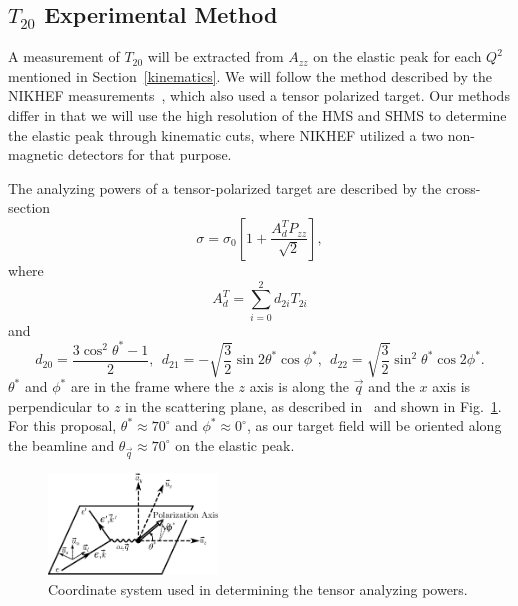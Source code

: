 \subsection{$T_{20}$ Experimental Method} %
\label{t20_exp}

A measurement of $T_{20}$ will be extracted from $A_{zz}$ on the elastic peak for each $Q^2$ mentioned in Section~\ref{kinematics}. We will follow the method described by the NIKHEF measurements~\cite{Bouwhuis:1998re}, which also used a tensor polarized target. Our methods differ in that we will use the high resolution of the HMS and SHMS to determine the elastic peak through kinematic cuts, where NIKHEF utilized a two non-magnetic detectors for that purpose. 

The analyzing powers of a tensor-polarized target are described by the cross-section
\begin{equation}
\sigma = \sigma_0\left[ 1 + \frac{A_d^T P_{zz}}{\sqrt{2}} \right],
\label{cs-ana}
\end{equation}
where
\begin{equation} A^T_d = \sum_{i=0}^{2}d_{2i}T_{2i}
\end{equation}
and
\begin{equation} d_{20} = \frac{3 \cos^2 \theta^* -1}{2},~~d_{21} = -\sqrt{\frac{3}{2}}\sin2\theta^*\cos\phi^*,~~d_{22}=\sqrt{\frac{3}{2}}\sin^2\theta^*\cos 2\phi^*.
\end{equation}
$\theta^*$ and $\phi^*$ are in the frame where the $z$ axis is along the $\vec{q}$ and the $x$ axis is perpendicular to $z$ in the scattering plane, as described in~\cite{Donnelly:1985ry} and shown in Fig.~\ref{coords}. For this proposal, $\theta^* \approx 70^{\circ}$ and $\phi^* \approx 0^{\circ}$, as our target field will be oriented along the beamline and $\theta_{\vec{q}}\approx 70^{\circ}$ on the elastic peak.

\begin{figure}
\begin{center}
\includegraphics[width=0.4\textwidth]{figs/coordinate_system.eps} 
\caption{\label{coords}Coordinate system used in determining the tensor analyzing powers.
}
\end{center}
\end{figure}

